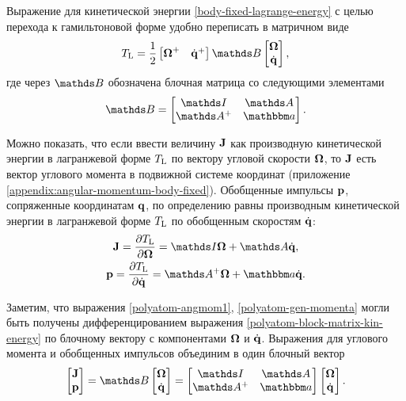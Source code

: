 Выражение для кинетической энергии \eqref{body-fixed-lagrange-energy} с целью перехода к гамильтоновой форме удобно переписать в матричном виде
\begin{gather}
    \Tl = \frac{1}{2} \begin{bmatrix} \bOmega^+ & \dot{\mf{q}}^+ \end{bmatrix} \bbB \begin{bmatrix} \bOmega \\ \dot{\mf{q}} \end{bmatrix}, \label{polyatom-block-matrix-kin-energy}
\end{gather}
%
где через $\bbB$ обозначена блочная матрица со следующими элементами 
\begin{gather}
    \bbB = \begin{bmatrix} 
    \bbI & \bbA \\ \bbA^+ & \bba 
    \end{bmatrix}.
\end{gather}

Можно показать, что если ввести величину $\mathbf{J}$ как производную кинетической энергии в лагранжевой форме $T_\text{L}$ по вектору угловой скорости $\boldsymbol{\Omega}$, то $\mathbf{J}$ есть вектор углового момента в подвижной системе координат (приложение \ref{appendix:angular-momentum-body-fixed}). Обобщенные импульсы $\mathbf{p}$, сопряженные координатам $\mathbf{q}$, по определению равны производным кинетической энергии в лагранжевой форме $T_\text{L}$ по обобщенным скоростям $\dot{\mathbf{q}}$: 
\begin{gather}
    \mf{J} = \frac{\partial \Tl}{\partial \bOmega} = \bbI \bOmega + \bbA \dot{\mf{q}}, \label{polyatom-angmom1} \\
\mf{p} = \frac{\partial \Tl}{\partial \dot{\mf{q}}} = \bbA^+ \bOmega + \bba \dot{\mf{q}} \label{polyatom-gen-momenta}.
\end{gather}

Заметим, что выражения \eqref{polyatom-angmom1}, \eqref{polyatom-gen-momenta} могли быть получены дифференцированием выражения  \eqref{polyatom-block-matrix-kin-energy} по блочному вектору с компонентами $\boldsymbol{\Omega}$ и $\dot{\mathbf{q}}$. Выражения для углового момента и обобщенных импульсов объединим в один блочный вектор
\begin{gather}
    \begin{bmatrix} \mf{J} \\ \mf{p} \end{bmatrix} = \bbB \begin{bmatrix} \bOmega \\ \dot{\mf{q}} \end{bmatrix} = 
    \begin{bmatrix} \bbI & \bbA \\ \bbA^+ & \bba \end{bmatrix} \begin{bmatrix} \bOmega \\ \dot{\mf{q}} \end{bmatrix}.
\end{gather}


